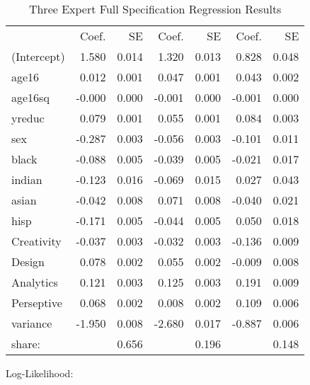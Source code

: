 \documentclass[12pt]{article}
\begin{document}
\begin{table} \centering
  \caption{Three Expert Full Specification Regression Results}
    \begin{threeparttable}
      \begin{tabular}[l]{l r r r r r r}
\cmidrule{1-7}                                                                           
                &  Coef.   &   SE   &   Coef.  & SE   &   Coef.  &  SE    \\
\cmidrule(l){2-3}  \cmidrule(l){4-5}  \cmidrule(l){6-7}
(Intercept)     &     1.580   &     0.014   &      1.320  &   0.013   &      0.828  &    0.048    \\
age16           &     0.012   &     0.001   &      0.047  &   0.001   &      0.043  &    0.002    \\
age16sq         &    -0.000   &     0.000   &     -0.001  &   0.000   &     -0.001  &    0.000    \\
yreduc          &     0.079   &     0.001   &      0.055  &   0.001   &      0.084  &    0.003    \\
sex             &    -0.287   &     0.003   &     -0.056  &   0.003   &     -0.101  &    0.011    \\
black           &    -0.088   &     0.005   &     -0.039  &   0.005   &     -0.021  &    0.017    \\
indian          &    -0.123   &     0.016   &     -0.069  &   0.015   &      0.027  &    0.043    \\
asian           &    -0.042   &     0.008   &      0.071  &   0.008   &     -0.040  &    0.021    \\
hisp            &    -0.171   &     0.005   &     -0.044  &   0.005   &      0.050  &    0.018    \\
Creativity      &    -0.037   &     0.003   &     -0.032  &   0.003   &     -0.136  &    0.009    \\
Design          &     0.078   &     0.002   &      0.055  &   0.002   &     -0.009  &    0.008    \\
Analytics       &     0.121   &     0.003   &      0.125  &   0.003   &      0.191  &    0.009    \\
Perseptive      &     0.068   &     0.002   &      0.008  &   0.002   &      0.109  &    0.006    \\
variance        &    -1.950   &     0.008   &     -2.680  &   0.017   &     -0.887  &    0.006    \\
\cmidrule(l){2-3}  \cmidrule(l){4-5}  \cmidrule(l){6-7}
share:          &             &     0.656   &             &   0.196   &             &   0.148     \\
\cmidrule{1-7} 
      \end{tabular}

      \begin{tablenotes}
        \item Log-Likelihood:

      \end{tablenotes} \label{tbl:3E_full_regressions_results}


    \end{threeparttable}

\end{table}
\end{document}
